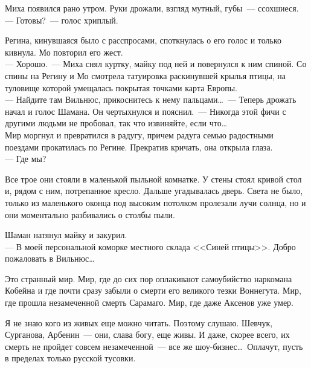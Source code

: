 \newpage

Миха появился рано утром. Руки дрожали, взгляд мутный, губы~--- ссохшиеся. \\
--- Готовы?~--- голос хриплый.

Регина, кинувшаяся было с расспросами, споткнулась о его голос и только 
кивнула. Мо повторил его жест.\\
--- Хорошо.~--- Миха снял куртку, майку под ней и повернулся к ним спиной. Со 
спины на Регину и Мо смотрела татуировка раскинувшей крылья птицы, на туловище 
которой умещалась покрытая точками карта Европы.\\
--- Найдите там Вильнюс, прикоснитесь к нему пальцами\ldots~--- Теперь дрожать 
начал и голос Шамана. Он чертыхнулся и пояснил.~--- Никогда этой фичи с другими людьми 
не пробовал, так что извиняйте, если что\ldots\\
Мир моргнул и превратился в радугу, причем радуга семью радостными поездами 
прокатилась по Регине. Прекратив кричать, она открыла глаза.\\
--- Где мы?

Все трое они стояли в маленькой пыльной комнатке. У стены стоял кривой стол и, 
рядом с ним, потрепанное кресло. Дальше угадывалась дверь. Света не было, 
только из маленького оконца под высоким потолком пролезали лучи солнца, но и они 
моментально разбивались о столбы пыли.

Шаман натянул майку и закурил.\\
--- В моей персональной коморке местного склада <<Синей птицы>>. Добро пожаловать 
в Вильнюс\ldots


Это странный мир. Мир, где до сих пор оплакивают самоубийство наркомана Кобейна 
и где почти сразу забыли о смерти его великого тезки Воннегута. Мир, где прошла 
незамеченной смерть Сарамаго. Мир, где даже Аксенов уже умер.


Я не знаю кого из живых еще можно читать. Поэтому слушаю. Шевчук, Сурганова, 
Арбенин~--- они, слава богу, еще живы. И даже, скорее всего, их смерть не 
пройдет совсем незамеченной~--- все же шоу-бизнес\ldots\ Оплачут, пусть в пределах 
только русской тусовки.

